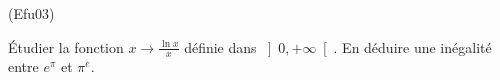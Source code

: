 \begin{tiny}(Efu03)\end{tiny} \'Etudier la fonction $x \rightarrow \frac{\ln x}{x}$ définie dans $\left] 0, + \infty \right[$. 
En déduire une inégalité entre $e^\pi$ et $\pi^e$.
